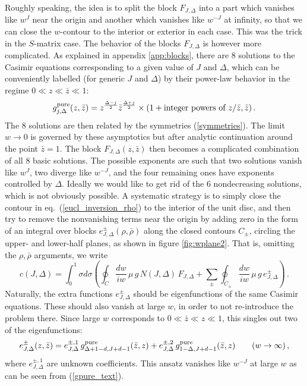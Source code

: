 \documentclass[11pt, reqno,preprint]{article}
\def\be{\begin{equation}}
\def\ee{\end{equation}}
\def\gpure{g^{\rm pure}}
\def\rhobar{\bar{\rho}}
\def\zbar{\bar{z}}
\def\j{J}
\def\c{c}
\begin{document}
Roughly speaking, the idea is to split the block $F_{\j,\Delta}$ into a part which vanishes like $w^\j$ near the origin and another which vanishes
like $w^{-\j}$ at infinity, so that we can close the $w$-contour to the interior or exterior in each case.
This was the trick in the $S$-matrix case.
The behavior of the blocks $F_{\j,\Delta}$ is however more complicated.
As explained in appendix \ref{app:blocks}, there are 8 solutions to the Casimir equations corresponding to a given value of $\j$ and $\Delta$,
which can be conveniently labelled (for generic $\j$ and $\Delta$) by their power-law behavior in the regime $0\ll z \ll \zbar \ll 1$:
\be
 \gpure_{j,\Delta}(z,\zbar) = z^{\frac{\Delta-j}{2}}\zbar^{\frac{\Delta+j}{2}}\times (1 + \mbox{integer powers of $z/\zbar,\zbar$})\,. \label{gpure_text}
\ee
The 8 solutions are then related by the symmetries (\ref{symmetries}).
The limit $w\to 0$ is governed by these asymptotics but after analytic continuation around the point $\zbar=1$.
The block $F_{\j,\Delta}(z,\zbar)$ then becomes a complicated combination of all 8 basic solutions.
The possible exponents are such that two solutions vanish like $w^{\j}$, two diverge like $w^{-\j}$,
and the four remaining ones have exponents controlled by $\Delta$.
Ideally we would like to get rid of the 6 nondecreasing solutions, which is not obviously possible.
A systematic strategy is to simply close the contour in eq.~(\ref{eucl_inversion_rho}) to the interior of the unit disc,
and then try to remove the nonvanishing terms near the origin by adding zero
in the form of an integral over blocks $e^\pm_{\j,\Delta}(\rho,\rhobar)$ along the closed contours $C_\pm$,
circling the upper- and lower-half planes, as shown in figure \ref{fig:wplane2}.
That is, omitting the $\rho,\rhobar$ arguments, we write
\be
 \c(\j,\Delta) = \int_0^1 \sigma d\sigma \left(
 \oint_{C} \frac{dw}{iw} \, \mu \,g\,N(\j,\Delta) \,F_{\j,\Delta}
 + \sum_{\pm} \oint_{C_\pm} \frac{dw}{i w} \,\mu\,g\,e^\pm_{\j,\Delta} \right)\,. \label{cj_inter_2}
\ee
Naturally, the extra functions $e^\pm_{\j,\Delta}$ should be eigenfunctions of the same Casimir equations.
These should also vanish at large $w$, in order to not re-introduce the problem there.
Since large $w$ corresponds to $0\ll \zbar\ll z\ll 1$, this singles out two of the eigenfunctions:
\be
 e^\pm_{\j,\Delta}(z,\zbar) =
  e^{\pm,1}_{\j,\Delta}\, \gpure_{\Delta+1-d,\j+d-1}(\zbar,z)
+e^{\pm,2}_{\j,\Delta}\, \gpure_{1-\Delta,\j+d-1}(\zbar,z)\qquad (w\to \infty)\,, \label{e_block}
\ee
where $e^{\pm,1}_{\j,\Delta}$ are unknown coefficients.
This ansatz vanishes like $w^{-\j}$ at large $w$ as can be seen from (\ref{gpure_text}).
\end{document}
